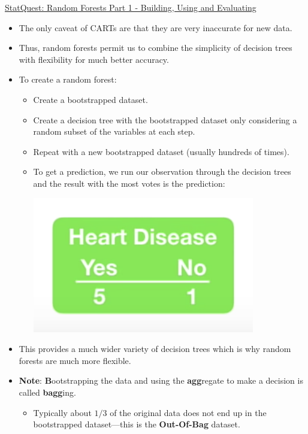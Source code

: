 \documentclass[12pt, titlepage, french]{report}
\begin{document}
\begin{YTB_SUMM_AUTO_NUMB}[label = {SQ-RF-PT1}]{\href{https://www.youtube.com/watch?v=J4Wdy0Wc_xQ&feature=youtu.be}{StatQuest: Random Forests Part 1 - Building, Using and Evaluating}}
\begin{itemize}[leftmargin = *]
	\item	The only caveat of CARTs are that they are very inaccurate for new data.
	\item	Thus, random forests permit us to combine the simplicity of decision trees with flexibility for much better accuracy.
	\item	To create a random forest:
		\begin{itemize}[leftmargin = *]
		\item	Create a bootstrapped dataset.
		\item	Create a decision tree with the bootstrapped dataset only considering a random subset of the variables at each step.
		\item	Repeat with a new bootstrapped dataset (usually hundreds of times).
		\item	To get a prediction, we run our observation through the decision trees and the result with the most votes is the prediction:
		\begin{center}
			\includegraphics[scale=0.4]{src/SQ-RF-VOTE.png}
		\end{center}
		\end{itemize}
	\item	This provides a much wider variety of decision trees which is why random forests are much more flexible.
	\item[]	\textbf{Note}: \textbf{B}ootstrapping the data and using the \textbf{agg}regate to make a decision is called \textbf{bagg}ing.
	\begin{itemize}[leftmargin = *]
		\item	Typically about $1/3$ of the original data does not end up in the bootstrapped dataset---this is the \textbf{Out-Of-Bag} dataset.

\end{itemize}
\end{itemize}
\end{YTB_SUMM_AUTO_NUMB}
\end{document}
